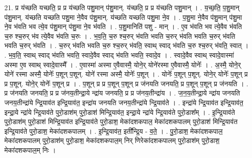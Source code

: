 \documentclass[17pt]{extarticle}
\begin{document}
21. प्र य॑च्छति यच्छति॒ प्र प्र य॑च्छति पशु॒मान् प॑शु॒मान्. य॑च्छति॒ प्र प्र य॑च्छति पशु॒मान् । . य॒च्छ॒ति॒ प॒शु॒मान् प॑शु॒मान्. य॑च्छति यच्छति पशु॒मा ने॒वैव प॑शु॒मान्. य॑च्छति यच्छति पशु॒मा ने॒व । . प॒शु॒मा ने॒वैव प॑शु॒मान् प॑शु॒मा ने॒व भ॑वति भव त्ये॒व प॑शु॒मान् प॑शु॒मा ने॒व भ॑वति । . प॒शु॒मानिति॑ पशु - मान् । . ए॒व भ॑वति भव त्ये॒वैव भ॑वति च॒रु श्च॒रुर् भ॑व त्ये॒वैव भ॑वति च॒रुः । . भ॒व॒ति॒ च॒रु श्च॒रुर् भ॑वति भवति च॒रुर् भ॑वति भवति च॒रुर् भ॑वति भवति च॒रुर् भ॑वति । . च॒रुर् भ॑वति भवति च॒रु श्च॒रुर् भ॑वति॒ स्वाथ् स्वाद् भ॑वति च॒रु श्च॒रुर् भ॑वति॒ स्वात् । . भ॒व॒ति॒ स्वाथ् स्वाद् भ॑वति भवति॒ स्वादे॒वैव स्वाद् भ॑वति भवति॒ स्वादे॒व । . स्वादे॒वैव स्वाथ् स्वादे॒वास्मा॑ अस्मा ए॒व स्वाथ् स्वादे॒वास्मै᳚ । . ए॒वास्मा॑ अस्मा ए॒वैवास्मै॒ योने॒र् योने॑रस्मा ए॒वैवास्मै॒ योनेः᳚ । . अ॒स्मै॒ योने॒र् योने॑ रस्मा अस्मै॒ योनेः᳚ प॒शून् प॒शून्. योने॑ रस्मा अस्मै॒ योनेः᳚ प॒शून् । . योनेः᳚ प॒शून् प॒शून्. योने॒र् योनेः᳚ प॒शून् प्र प्र प॒शून्. योने॒र् योनेः᳚ प॒शून् प्र । . प॒शून् प्र प्र प॒शून् प॒शून् प्र ज॑नयति जनयति॒ प्र प॒शून् प॒शून् प्र ज॑नयति । . प्र ज॑नयति जनयति॒ प्र प्र ज॑नय॒तीन्द्रा॒ये न्द्रा॑य जनयति॒ प्र प्र ज॑नय॒तीन्द्रा॑य । . ज॒न॒य॒तीन्द्रा॒ये न्द्रा॑य जनयति जनय॒तीन्द्रा॑ये न्द्रि॒याव॑त इन्द्रि॒याव॑त॒ इन्द्रा॑य जनयति जनय॒तीन्द्रा॑ये न्द्रि॒याव॑ते । . इन्द्रा॑ये न्द्रि॒याव॑त इन्द्रि॒याव॑त॒ इन्द्रा॒ये न्द्रा॑ये न्द्रि॒याव॑ते पुरो॒डाश॑म् पुरो॒डाश॑ मिन्द्रि॒याव॑त॒ इन्द्रा॒ये न्द्रा॑ये न्द्रि॒याव॑ते पुरो॒डाश᳚म् । . इ॒न्द्रि॒याव॑ते पुरो॒डाश॑म् पुरो॒डाश॑ मिन्द्रि॒याव॑त इन्द्रि॒याव॑ते पुरो॒डाश॒ मेका॑दशकपाल॒ मेका॑दशकपालम् पुरो॒डाश॑ मिन्द्रि॒याव॑त इन्द्रि॒याव॑ते पुरो॒डाश॒ मेका॑दशकपालम् । . इ॒न्द्रि॒याव॑त॒ इती᳚न्द्रि॒य - व॒ते॒ । . पु॒रो॒डाश॒ मेका॑दशकपाल॒ मेका॑दशकपालम् पुरो॒डाश॑म् पुरो॒डाश॒ मेका॑दशकपाल॒म् निर् णिरेका॑दशकपालम् पुरो॒डाश॑म् पुरो॒डाश॒ मेका॑दशकपाल॒म् निः । \newline
\end{document}
